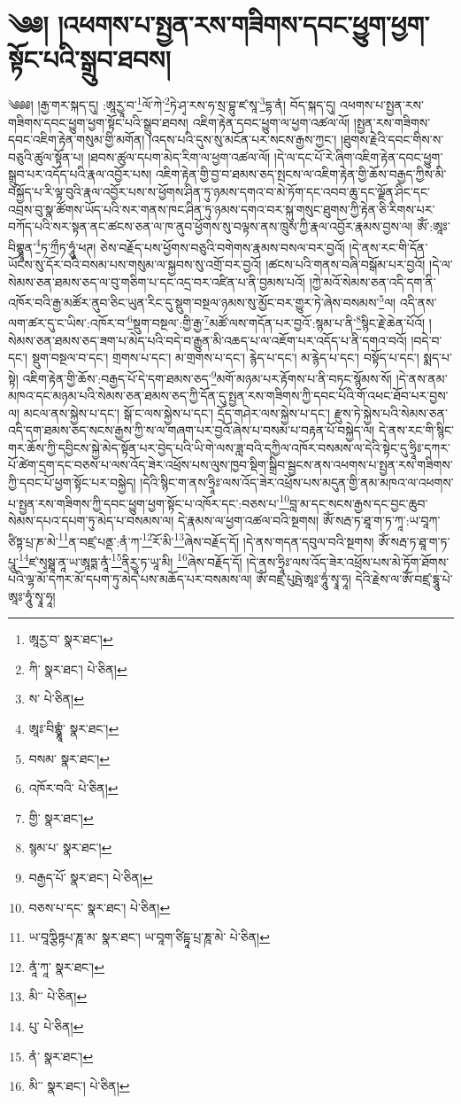 \setcounter{footnote}{0} 
\chapter{༄༅། །འཕགས་པ་སྤྱན་རས་གཟིགས་དབང་ཕྱུག་ཕྱག་སྟོང་པའི་སྒྲུབ་ཐབས།}༄༅༅། །རྒྱ་གར་སྐད་དུ། :ཨཱརྱཱ་བ་\footnote{ཨཱརྱ་བ་  སྣར་ཐང་། }ལོ་ཀེ་\footnote{ཀི་  སྣར་ཐང་།  པེ་ཅིན། }ཏེ་ཤྭ་རས་ཧ་སྲ་བྷུ་ཛ་སཱ་\footnote{ས་  པེ་ཅིན། }དྷ་ནཾ། བོད་སྐད་དུ། འཕགས་པ་སྤྱན་རས་གཟིགས་དབང་ཕྱུག་ཕྱག་སྟོང་པའི་སྒྲུབ་ཐབས། འཇིག་རྟེན་དབང་ཕྱུག་ལ་ཕྱག་འཚལ་ལོ། །སྤྱན་རས་གཟིགས་དབང་འཇིག་རྟེན་གསུམ་གྱི་མགོན། །འདས་པའི་དུས་སུ་མངོན་པར་སངས་རྒྱས་ཀྱང་། །ཐུགས་རྗེའི་དབང་གིས་ས་བཅུའི་ཚུལ་སྟོན་པ། །ཐབས་ཚུལ་དཔག་མེད་རིག་ལ་ཕྱག་འཚལ་ལོ། །དེ་ལ་དང་པོ་རེ་ཞིག་འཇིག་རྟེན་དབང་ཕྱུག་སྒྲུབ་པར་འདོད་པའི་རྣལ་འབྱོར་པས། འཇིག་རྟེན་གྱི་བྱ་བ་ཐམས་ཅད་སྤངས་ལ་འཇིག་རྟེན་གྱི་ཆོས་བརྒྱད་ཀྱིས་མི་བསྐྱོད་པ་རི་ལྟ་བུའི་རྣལ་འབྱོར་པས་ས་ཕྱོགས་ཤིན་ཏུ་ཉམས་དགའ་བ་མེ་ཏོག་དང་འབབ་ཆུ་དང་ལྗོན་ཤིང་དང་འབྲས་བུ་སྣ་ཚོགས་ཡོད་པའི་སར་གནས་ཁང་ཤིན་ཏུ་ཉམས་དགའ་བར་སྐུ་གསུང་ཐུགས་ཀྱི་རྟེན་ཅི་རིགས་པར་བཀོད་པའི་སར་སྟན་ནང་ཚངས་ཅན་ལ་ཁ་ནུབ་ཕྱོགས་སུ་བལྟས་ནས་ཁྲུས་ཀྱི་རྣལ་འབྱོར་རྣམས་བྱས་ལ། ཨོཾ་:ཨཱཿ་བིགྷྣཱན་\footnote{ཨཱཿ་བིགྷྣཱཾ་  སྣར་ཐང་། }ཏ་ཀྲྀཏ་ཧཱུཾ་ཕཊ། ཅེས་བརྗོད་པས་ཕྱོགས་བཅུའི་བགེགས་རྣམས་བསལ་བར་བྱའོ། །དེ་ནས་རང་གི་དོན་ཡོངས་སུ་དོར་བའི་བསམ་པས་གསུམ་ལ་སྐྱབས་སུ་འགྲོ་བར་བྱའོ། །ཚངས་པའི་གནས་བཞི་བསྒོམ་པར་བྱའོ། །དེ་ལ་སེམས་ཅན་ཐམས་ཅད་ལ་བུ་གཅིག་པ་དང་འདྲ་བར་འཛིན་པ་ནི་བྱམས་པའོ། །ཀྱེ་མའོ་སེམས་ཅན་འདི་དག་ནི་འཁོར་བའི་རྒྱ་མཚོར་ནུབ་ཅིང་ཡུན་རིང་དུ་སྡུག་བསྔལ་ཉམས་སུ་མྱོང་བར་གྱུར་ཏེ་ཞེས་བསམས་\footnote{བསམ་  སྣར་ཐང་། }ལ། འདི་ནས་ལག་ཚར་དུ་ང་ཡིས་:འཁོར་བ་\footnote{འཁོར་བའི་  པེ་ཅིན། }སྡུག་བསྔལ་:གྱི་རྒྱ་\footnote{གྱི་  སྣར་ཐང་། }མཚོ་ལས་གདོན་པར་བྱའོ་:སྙམ་པ་ནི་\footnote{སྙམ་པ་  སྣར་ཐང་། }སྙིང་རྗེ་ཆེན་པོའོ། །སེམས་ཅན་ཐམས་ཅད་ཟག་པ་མེད་པའི་བདེ་བ་རྒྱུན་མི་འཆད་པ་ལ་འཇོག་པར་འདོད་པ་ནི་དགའ་བའོ། །བདེ་བ་དང་། སྡུག་བསྔལ་བ་དང་། གྲགས་པ་དང་། མ་གྲགས་པ་དང་། རྙེད་པ་དང་། མ་རྙེད་པ་དང་། བསྟོད་པ་དང་། སྨད་པ་སྟེ། འཇིག་རྟེན་གྱི་ཆོས་:བརྒྱད་པོ་དེ་དག་ཐམས་ཅད་\footnote{བརྒྱད་པོ་  སྣར་ཐང་།  པེ་ཅིན། }མགོ་མཉམ་པར་རྟོགས་པ་ནི་བཏང་སྙོམས་སོ། །དེ་ནས་ནམ་མཁའ་དང་མཉམ་པའི་སེམས་ཅན་ཐམས་ཅད་ཀྱི་དོན་དུ་སྤྱན་རས་གཟིགས་ཀྱི་དབང་པོའི་གོ་འཕང་ཐོབ་པར་བྱས་ལ། མངལ་ནས་སྐྱེས་པ་དང་། སྒོ་ང་ལས་སྐྱེས་པ་དང་། དྲོད་གཤེར་ལས་སྐྱེས་པ་དང་། རྫུས་ཏེ་སྐྱེས་པའི་སེམས་ཅན་འདི་དག་ཐམས་ཅད་སངས་རྒྱས་ཀྱི་ས་ལ་གཞག་པར་བྱའོ་ཞེས་པ་བསམ་པ་བརྟན་པོ་བསྐྱེད་ལ། དེ་ནས་རང་གི་སྙིང་གར་ཆོས་ཀྱི་དབྱིངས་སྐྱེ་མེད་སྟོན་པར་བྱེད་པའི་ཡི་གེ་ལས་ཟླ་བའི་དཀྱིལ་འཁོར་བསམས་ལ་དེའི་སྟེང་དུ་ཧྲཱིཿ་དཀར་པོ་ཚེག་དྲག་དང་བཅས་པ་ལས་འོད་ཟེར་འཕྲོས་པས་ལུས་ཁྱབ་སྡིག་སྒྲིབ་སྦྱངས་ནས་འཕགས་པ་སྤྱན་རས་གཟིགས་ཀྱི་དབང་པོ་ཕྱག་སྟོང་པར་བསྐྱེད། །དེའི་སྙིང་ག་ནས་ཧྲཱིཿ་ལས་འོད་ཟེར་འཕྲོས་པས་མདུན་གྱི་ནམ་མཁའ་ལ་འཕགས་པ་སྤྱན་རས་གཟིགས་ཀྱི་དབང་ཕྱུག་ཕྱག་སྟོང་པ་འཁོར་དང་:བཅས་པ་\footnote{བཅས་པ་དང་  སྣར་ཐང་།  པེ་ཅིན། }བླ་མ་དང་སངས་རྒྱས་དང་བྱང་ཆུབ་སེམས་དཔའ་དཔག་ཏུ་མེད་པ་བསམས་ལ། དེ་རྣམས་ལ་ཕྱག་འཚལ་བའི་སྔགས། ཨོཾ་སརྦ་ཏ་ཐཱ་ག་ཏ་ཀཱ་:ཡ་བཱཀ་ཙིཏྟ་པྲ་ཎ་མེ་\footnote{ཡ་བཱཀྩིཏྟཔ་ཎཱ་མ་  སྣར་ཐང་། ཡ་བཱག་ཙིདྟཱ་པྲ་ཎཱ་མེ་  པེ་ཅིན། }ན་བཛྲ་པནྡ་:ནཾ་ཀ་\footnote{ནཱཾ་ཀཱ་  སྣར་ཐང་། }རོ་མི་\footnote{མི་་  པེ་ཅིན། }ཞེས་བརྗོད་དོ། །དེ་ནས་གདན་དབུལ་བའི་སྔགས། ཨོཾ་སརྦ་ཏ་ཐཱ་ག་ཏ་པཱུ་\footnote{པུ་  པེ་ཅིན། }ཛ་སྭསྠཱ་ནཱ་ཡ་ཨཱཏྨ་ནཱཾ་\footnote{ནཾ་  སྣར་ཐང་། }ནིརྱཱ་ཏ་ཡཱ་མི། \footnote{མི་་  སྣར་ཐང་།  པེ་ཅིན། }ཞེས་བརྗོད་དོ། །དེ་ནས་ཧྲཱིཿ་ལས་འོད་ཟེར་འཕྲོས་པས་མེ་ཏོག་ཐོགས་པའི་ལྷ་མོ་དཀར་མོ་དཔག་ཏུ་མེད་པས་མཆོད་པར་བསམས་ལ། ཨོཾ་བཛྲ་པུཥྤེ་ཨཱཿ་ཧཱུཾ་སྭཱ་ཧཱ། དེའི་རྗེས་ལ་ཨོཾ་བཛྲ་དྷཱུ་པེ་ཨཱཿ་ཧཱུཾ་སྭཱ་ཧཱ། 